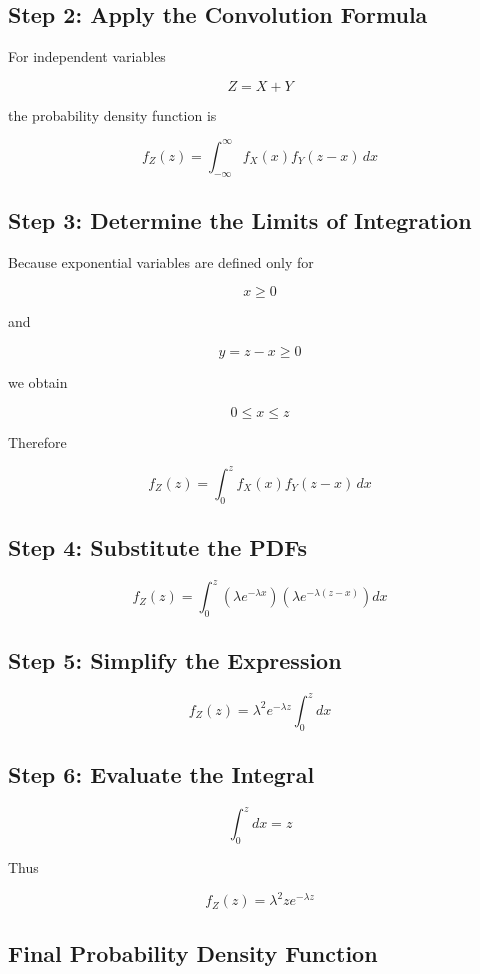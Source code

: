 \documentclass[12pt]{article}
\begin{document}
\subsection*{Step 2: Apply the Convolution Formula}

For independent variables

\[
Z = X + Y
\]

the probability density function is

\[
f_Z(z) =
\int_{-\infty}^{\infty}
f_X(x)f_Y(z-x)\,dx
\]

\subsection*{Step 3: Determine the Limits of Integration}

Because exponential variables are defined only for

\[
x \ge 0
\]

and

\[
y = z-x \ge 0
\]

we obtain

\[
0 \le x \le z
\]

Therefore

\[
f_Z(z) =
\int_0^z
f_X(x)f_Y(z-x)\,dx
\]

\subsection*{Step 4: Substitute the PDFs}

\[
f_Z(z) =
\int_0^z
(\lambda e^{-\lambda x})
(\lambda e^{-\lambda(z-x)})
dx
\]

\subsection*{Step 5: Simplify the Expression}

\[
f_Z(z) =
\lambda^2 e^{-\lambda z}
\int_0^z dx
\]

\subsection*{Step 6: Evaluate the Integral}

\[
\int_0^z dx = z
\]

Thus

\[
f_Z(z) =
\lambda^2 z e^{-\lambda z}
\]

\subsection*{Final Probability Density Function}
\end{document}
